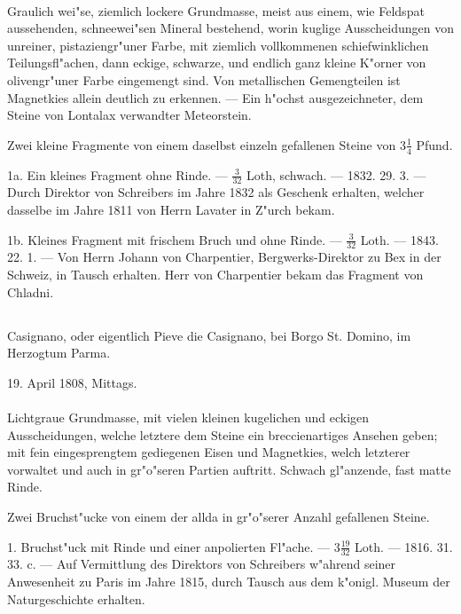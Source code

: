 \documentclass[a4paper, 11pt, oneside, polutonikogreek, german]{article}
\begin{document}
\paragraph{}
Graulich wei"se, ziemlich lockere Grundmasse, meist aus einem, wie Feldspat aussehenden, schneewei"sen Mineral bestehend‚ worin kuglige Ausscheidungen von unreiner, pistaziengr"uner Farbe, mit ziemlich vollkommenen schiefwinklichen Teilungsfl"achen, dann eckige, schwarze, und endlich ganz kleine K"orner von olivengr"uner Farbe eingemengt sind. Von metallischen Gemengteilen ist Magnetkies allein deutlich zu erkennen. --- Ein h"ochst ausgezeichneter, dem Steine von Lontalax verwandter Meteorstein.

Zwei kleine Fragmente von einem daselbst einzeln gefallenen Steine von $\mathfrak{3\frac{1}{4}}$ Pfund.

1a. Ein kleines Fragment ohne Rinde. --- $\mathfrak{\frac{3}{32}}$ Loth, schwach. --- 1832. 29. 3. --- Durch Direktor von Schreibers im Jahre 1832 als Geschenk erhalten, welcher dasselbe im Jahre 1811 von Herrn Lavater in Z"urch bekam.

1b. Kleines Fragment mit frischem Bruch und ohne Rinde. --- $\mathfrak{\frac{3}{32}}$ Loth. --- 1843. 22. 1. --- Von Herrn Johann von Charpentier, Bergwerks-Direktor zu Bex in der Schweiz, in Tausch erhalten. Herr von Charpentier bekam das Fragment von Chladni.
\subsection{}
\begin{center}

Casignano, oder eigentlich Pieve die Casignano, bei Borgo St. Domino, im Herzogtum Parma.

19. April 1808, Mittags.
\end{center}
\paragraph{}
Lichtgraue Grundmasse, mit vielen kleinen kugelichen und eckigen Ausscheidungen, welche letztere dem Steine ein breccienartiges Ansehen geben; mit fein eingesprengtem gediegenen Eisen und Magnetkies, welch letzterer vorwaltet und auch in gr"o"seren Partien auftritt. Schwach gl"anzende, fast matte Rinde.

Zwei Bruchst"ucke von einem der allda in gr"o"serer Anzahl gefallenen Steine.

1. Bruchst"uck mit Rinde und einer anpolierten Fl"ache. --- $\mathfrak{3\frac{19}{32}}$ Loth. --- 1816. 31. 33. c. --- Auf Vermittlung des Direktors von Schreibers w"ahrend seiner Anwesenheit zu Paris im Jahre 1815, durch Tausch aus dem k"onigl. Museum der Naturgeschichte erhalten.
\end{document}
